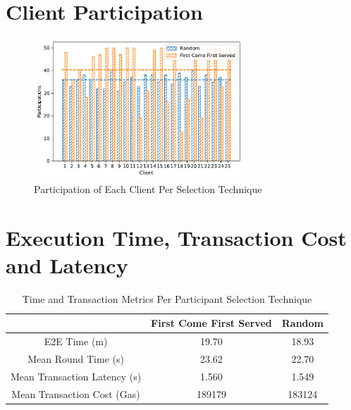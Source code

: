 
\section{Client Participation}

\begin{figure}[!ht]
    \centering
    \centering
    \includegraphics[width=0.7\textwidth]{graphics/selection/clients.pdf}
    \caption{Participation of Each Client Per Selection Technique}
    \label{fig:participations_client}
\end{figure}

\section{Execution Time, Transaction Cost and Latency}

\begin{table}[!ht]
\begin{tabular}{c|c|c} \hline \hline
                              & First Come First Served & Random \\ \hline \hline
E2E Time (m)                   & 19.70                   & 18.93  \\ \hline
Mean Round Time (s)            & 23.62                   & 22.70  \\ \hline
Mean Transaction Latency (s)   & 1.560                   & 1.549  \\ \hline
Mean Transaction Cost (Gas)    & 189179                  & 183124 \\ \hline
\end{tabular}
\caption{Time and Transaction Metrics Per Participant Selection Technique}
\label{tab:metrics_selection}
\end{table}

